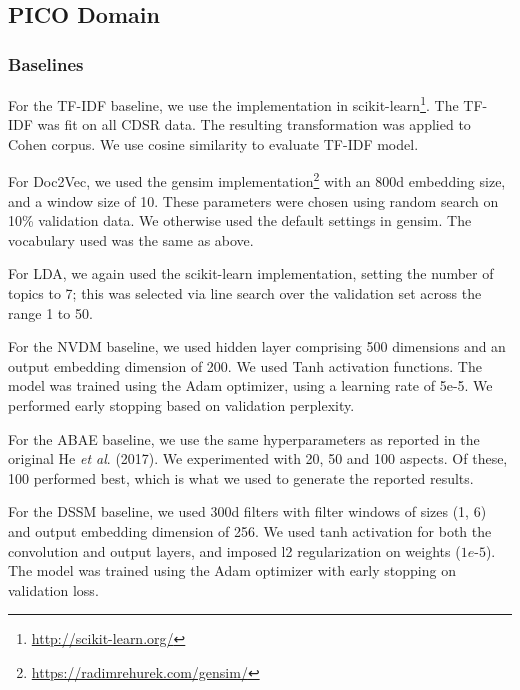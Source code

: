 \documentclass[11pt,a4paper]{article}
\begin{document}
\subsection{PICO Domain}

\subsubsection{Baselines} For the TF-IDF baseline, we use the implementation in scikit-learn\footnote{\url{http://scikit-learn.org/}}. The TF-IDF was fit on all CDSR data. The resulting transformation was applied to Cohen corpus. We use cosine similarity to evaluate TF-IDF model.

For Doc2Vec, we used the gensim implementation\footnote{\url{https://radimrehurek.com/gensim/}} with an 800d embedding size, and a window size of 10. These parameters were chosen using random search on 10\% validation data. We otherwise used the default settings in gensim. The vocabulary used was the same as above. 

For LDA, we again used the scikit-learn implementation, setting the number of topics to 7; this was selected via line search over the validation set across the range 1 to 50. %

For the NVDM baseline, we used hidden layer comprising 500 dimensions and an output embedding dimension of 200. We used Tanh activation functions. The model was trained using the Adam optimizer, using a learning rate of 5e-5. We performed early stopping based on validation perplexity. %

For the ABAE baseline, we use the same hyperparameters as reported in the original He \emph{et al}. (2017). We experimented with 20, 50 and 100 aspects. Of these, 100 performed best, which is what we used to generate the reported results. 

For the DSSM baseline, we used 300d filters with filter windows of sizes (1, 6) and output embedding dimension of 256. We used tanh activation for both the convolution and output layers, and imposed l2 regularization on weights ($1e$-$5$). The model was trained using the Adam optimizer with early stopping on validation loss. %
\end{document}
